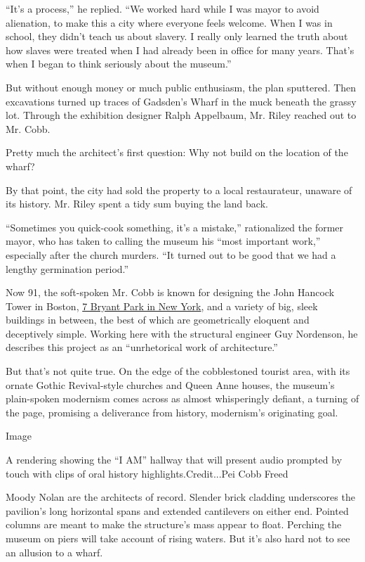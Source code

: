 ``It's a process,'' he replied. ``We worked hard while I was mayor to
avoid alienation, to make this a city where everyone feels welcome. When
I was in school, they didn't teach us about slavery. I really only
learned the truth about how slaves were treated when I had already been
in office for many years. That's when I began to think seriously about
the museum.''

But without enough money or much public enthusiasm, the plan sputtered.
Then excavations turned up traces of Gadsden's Wharf in the muck beneath
the grassy lot. Through the exhibition designer Ralph Appelbaum, Mr.
Riley reached out to Mr. Cobb.

Pretty much the architect's first question: Why not build on the
location of the wharf?

By that point, the city had sold the property to a local restaurateur,
unaware of its history. Mr. Riley spent a tidy sum buying the land back.

``Sometimes you quick-cook something, it's a mistake,'' rationalized the
former mayor, who has taken to calling the museum his ``most important
work,'' especially after the church murders. ``It turned out to be good
that we had a lengthy germination period.''

Now 91, the soft-spoken Mr. Cobb is known for designing the John Hancock
Tower in Boston,
\href{https://www.nytimes3xbfgragh.onion/2015/11/19/arts/design/7-bryant-park-embraces-its-place-in-the-city.html}{7
Bryant Park in New York}, and a variety of big, sleek buildings in
between, the best of which are geometrically eloquent and deceptively
simple. Working here with the structural engineer Guy Nordenson, he
describes this project as an ``unrhetorical work of architecture.''

But that's not quite true. On the edge of the cobblestoned tourist area,
with its ornate Gothic Revival-style churches and Queen Anne houses, the
museum's plain-spoken modernism comes across as almost whisperingly
defiant, a turning of the page, promising a deliverance from history,
modernism's originating goal.

Image

A rendering showing the ``I AM'' hallway that will present audio
prompted by touch with clips of oral history highlights.Credit...Pei
Cobb Freed

Moody Nolan are the architects of record. Slender brick cladding
underscores the pavilion's long horizontal spans and extended
cantilevers on either end. Pointed columns are meant to make the
structure's mass appear to float. Perching the museum on piers will take
account of rising waters. But it's also hard not to see an allusion to a
wharf.

